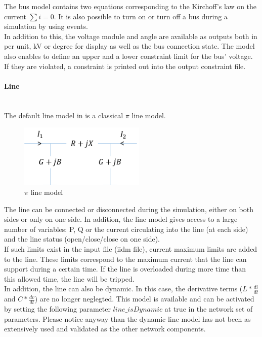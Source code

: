\documentclass[a4paper, 12pt]{report}
\begin{document}
The bus model contains two equations corresponding to the Kirchoff's law on the current $\sum i = 0$. It is also possible to turn on or turn off a bus during a simulation by using events. \\
In addition to this, the voltage module and angle are available as outputs both in per unit, kV or degree for display as well as the bus connection state. The model also enables to define an upper and a lower constraint limit for the bus' voltage. If they are violated, a constraint is printed out into the output constraint file. \\

\paragraph{Line}
~~\\

The default line model in \Dynawo is a classical $\pi$ line model.

\begin{figure}[h!]
\centering
\includegraphics[width=60mm]{../resources/PiLine.png}
\caption{$\pi$ line model}
\end{figure}

The line can be connected or disconnected during the simulation, either on both sides or only on one side. In addition, the line model gives access to a large number of variables: P, Q or the current circulating into the line (at each side) and the line status (open/close/close on one side). \\
If such limits exist in the input file (iidm file), current maximum limits are added to the line. These limits correspond to the maximum current that the line can support during a certain time. If the line is overloaded during more time than this allowed time, the line will be tripped. \\

In addition, the line can also be dynamic. In this case, the derivative terms ($L * \frac{di}{dt}$ and $C * \frac{dv}{dt}$) are no longer neglegted. This model is available and can be activated by setting the following parameter $line\_isDynamic$ at true in the network set of parameters. Please notice anyway than the dynamic line model has not been as extensively used and validated as the other network components.
\end{document}
